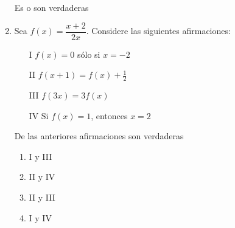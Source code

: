 \documentclass[10pt,twoside]{article}
\begin{document}
\begin{enumerate}
      Es o son verdaderas
      \begin{enumerate}
      \end{enumerate}
    \item Sea $ f(x)=\dfrac{x+2}{2x} $. Considere las siguientes afirmaciones:
    \begin{multicols}{2}
      \begin{itemize}
        \item[I] $ f(x)=0 $ sólo si $ x=-2 $
        \item[II] $ f(x+1)=f(x)+\frac{1}{2} $
        \item[III] $ f(3x)=3f(x) $
        \item[IV] Si $ f(x)=1 $, entonces $ x=2 $
      \end{itemize}
          \end{multicols}
      De las anteriores afirmaciones son  verdaderas
      \begin{multicols}{4}
        \begin{enumerate}
          \item I y III
          \item II y IV
          \item II y III
          \item I y IV
        \end{enumerate}
      \end{multicols}
      \end{enumerate}
\end{document}
